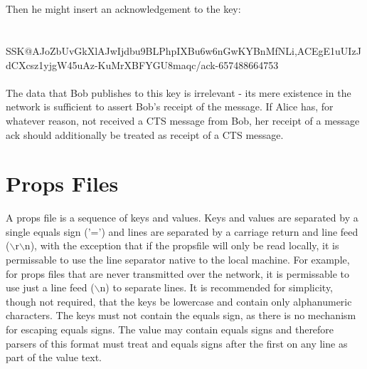 \documentclass[12pt,a4paper]{article}
\begin{document}
 \\
\\
Then he might insert an acknowledgement to the key: \\
\\
\\
SSK@AJoZbUvGkXlAJwI\-jdbu9BLPhpIXBu6\-w6nGwKYBnMfNLi,ACEgE1uUIzJdC\-Xcsz1yjgW45u\-Az-KuMrXBFYG\-U8maqc/ack-657488664753 \\
\\
The data that Bob publishes to this key is irrelevant - its mere existence in the network is sufficient to assert Bob's receipt of the message. If Alice has, for whatever reason, not received a CTS message from Bob, her receipt of a message ack should additionally be treated as receipt of a CTS message.

\appendix

\section{Props Files}
\label{PropsFile}
A props file is a sequence of keys and values. Keys and values are separated by a single equals sign ('=') and lines are separated by a carriage return and line feed ($\backslash$r$\backslash$n), with the exception that if the propsfile will only be read locally, it is permissable to use the line separator native to the local machine. For example, for props files that are never transmitted over the network, it is permissable to use just a line feed ($\backslash$n) to separate lines. It is recommended for simplicity, though not required, that the keys be lowercase and contain only alphanumeric characters. The keys must not contain the equals sign, as there is no mechanism for escaping equals signs. The value may contain equals signs and therefore parsers of this format must treat and equals signs after the first on any line as part of the value text.
\end{document}
